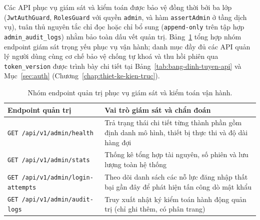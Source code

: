 Các API phục vụ giám sát và kiểm toán được bảo vệ đồng thời bởi ba lớp (\texttt{JwtAuthGuard}, \texttt{RolesGuard} với quyền \texttt{admin}, và hàm \texttt{assertAdmin} ở tầng dịch vụ), tuân thủ nguyên tắc chỉ đọc hoặc chỉ bổ sung (\texttt{append-only} trên tập hợp \texttt{admin\_\allowbreak{}audit\_\allowbreak{}logs}) nhằm bảo toàn dấu vết quản trị. Bảng~\ref{tab:api-quan-tri} tổng hợp nhóm endpoint giám sát trọng yếu phục vụ vận hành; danh mục đầy đủ các API quản lý người dùng cùng cơ chế bảo vệ chống tự khoá và thu hồi phiên qua \texttt{token\_\allowbreak{}version} được trình bày chi tiết tại Bảng~\ref{tab:bang-dinh-tuyen-api} và Mục~\ref{sec:auth} (Chương~\ref{chap:thiet-ke-kien-truc}).

\begin{table}[htbp]
    \centering
    \caption{Nhóm endpoint quản trị phục vụ giám sát và kiểm toán vận hành.}
    \label{tab:api-quan-tri}
    \small
    \begin{tabularx}{\textwidth}{@{}>{\raggedright\arraybackslash}p{}>{\raggedright\arraybackslash}X@{}}
        \toprule
        \textbf{Endpoint quản trị} & \textbf{Vai trò giám sát và chẩn đoán} \\
        \midrule
        \texttt{GET /\allowbreak{}api/\allowbreak{}v1/\allowbreak{}admin/\allowbreak{}health} & Trả trạng thái chi tiết từng thành phần gồm định danh mô hình, thiết bị thực thi và độ dài hàng đợi \\
        \texttt{GET /\allowbreak{}api/\allowbreak{}v1/\allowbreak{}admin/\allowbreak{}stats} & Thống kê tổng hợp tài nguyên, số phiên và lưu lượng toàn hệ thống \\
        \texttt{GET /\allowbreak{}api/\allowbreak{}v1/\allowbreak{}admin/\allowbreak{}login-\allowbreak{}attempts} & Theo dõi danh sách các nỗ lực đăng nhập thất bại gần đây để phát hiện tấn công dò mật khẩu \\
        \texttt{GET /\allowbreak{}api/\allowbreak{}v1/\allowbreak{}admin/\allowbreak{}audit-\allowbreak{}logs} & Truy xuất nhật ký kiểm toán hành động quản trị (chỉ ghi thêm, có phân trang) \\
        \bottomrule
    \end{tabularx}
\end{table}

